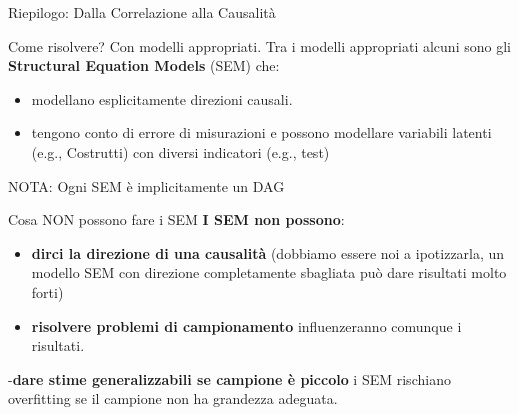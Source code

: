 \documentclass[
  ignorenonframetext,
]{beamer}
\providecommand{\tightlist}{%
  \setlength{\itemsep}{0pt}\setlength{\parskip}{0pt}}
\begin{document}
\begin{frame}{Riepilogo: Dalla Correlazione alla Causalità}
\label{riepilogo-dalla-correlazione-alla-causalituxe0}
\begin{center}
\end{center}
\end{frame}

\begin{frame}{Come risolvere? Con modelli appropriati.}
\label{come-risolvere-con-modelli-appropriati.}
Tra i modelli appropriati alcuni sono gli \textbf{Structural Equation
Models} (SEM) che:

\begin{itemize}
\tightlist
\item
  modellano esplicitamente direzioni causali.
\item
  tengono conto di errore di misurazioni e possono modellare variabili
  latenti (e.g., Costrutti) con diversi indicatori (e.g., test)
\end{itemize}

NOTA: Ogni SEM è implicitamente un DAG
\end{frame}

\begin{frame}{Cosa NON possono fare i SEM}
\label{cosa-non-possono-fare-i-sem}
\textbf{I SEM non possono}:

\begin{itemize}
\item
  \textbf{dirci la direzione di una causalità} (dobbiamo essere noi a
  ipotizzarla, un modello SEM con direzione completamente sbagliata può
  dare risultati molto forti)
\item
  \textbf{risolvere problemi di campionamento} influenzeranno comunque i
  risultati.
\end{itemize}

-\textbf{dare stime generalizzabili se campione è piccolo} i SEM
rischiano overfitting se il campione non ha grandezza adeguata.
\end{frame}
\end{document}
